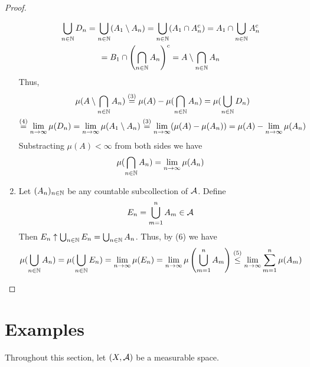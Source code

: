 \begin{proof}
\begin{enumerate}
		\begin{multline*}
		\bigcup_{n\in\mathbb{N}} D_n = \bigcup_{n \in \mathbb{N}} (A_1\setminus A_n) = \bigcup_{n \in \mathbb{N}} (A_1\cap A_n^c) = A_1 \cap \bigcup_{n \in \mathbb{N}} A_n^c \\
		= B_1 \cap \left(\bigcap_{n \in \mathbb{N}} A_n\right)^c = A \setminus \bigcap_{n\in\mathbb{N}} A_n
		\end{multline*}
		Thus,
		\begin{multline*}
		\mu(A \setminus \bigcap_{n\in\mathbb{N}} A_n) \overset{(3)}{=} \mu(A) - \mu(\bigcap_{n\in\mathbb{N}} A_n) = \mu(\bigcup_{n \in \mathbb{N}} D_n) \\
		\overset{(4)}{=} \lim_{n\to \infty}\mu(D_n) = \lim_{n\to \infty} \mu(A_1 \setminus A_n) \overset{(3)}{=} \lim_{n\to \infty} (\mu(A) - \mu(A_n)) = \mu(A) - \lim_{n\to \infty} \mu(A_n)
		\end{multline*}
		Substracting $\mu(A) <\infty$ from both sides we have
		\begin{align*}
		\mu(\bigcap_{n \in \mathbb{N}} A_n) = \lim_{n\to \infty} \mu(A_n)
		\end{align*}
		\item Let $(A_n)_{n\in\mathbb{N}}$ be any countable subcollection of $\mathcal{A}$. Define
		\begin{align*}
		E_n = \bigcup_{m = 1}^n A_m \in \mathcal{A}
		\end{align*}
		Then $E_n \uparrow \bigcup_{n\in\mathbb{N}} E_n = \bigcup_{n\in\mathbb{N}} A_n$. Thus, by (6) we have
		\begin{align*}
		\mu(\bigcup_{n\in\mathbb{N}} A_n) = \mu(\bigcup_{n\in\mathbb{N}} E_n) = \lim_{n\to \infty} \mu(E_n) = \lim_{n\to \infty} \mu\left(\bigcup_{m = 1}^n A_m\right) \overset{(5)}{\leq}\lim_{n\to \infty} \sum_{m=1}^{n}\mu(A_m)
		\end{align*}
	\end{enumerate}
\end{proof}


\section{Examples}

Throughout this section, let $(X, \mathcal{A})$ be a measurable space.

